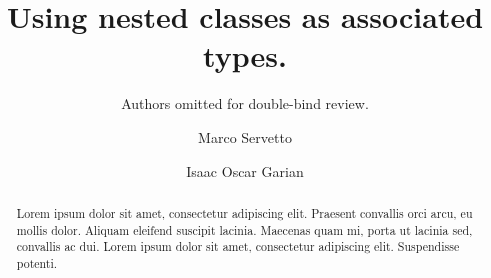 \documentclass[a4paper,UKenglish]{lipics-v2018}
\title{Using nested classes as associated types.}
\author{Authors omitted for double-bind review.}{Unspecified Institution.}{}{}{}
\author{Marco Servetto}{Victoria University of Wellington}{marco.servetto@ecs.vuw.ac.nz}{}{}
\author{Isaac Oscar Garian}{Victoria University of Wellington}{isaac@ecs.vuw.ac.nz}{}{}
\begin{document}
\maketitle

\begin{abstract}
Lorem ipsum dolor sit amet, consectetur adipiscing elit. Praesent convallis orci arcu, eu mollis dolor. Aliquam eleifend suscipit lacinia. Maecenas quam mi, porta ut lacinia sed, convallis ac dui. Lorem ipsum dolor sit amet, consectetur adipiscing elit. Suspendisse potenti. 
 \end{abstract}





\appendix


\end{document}
